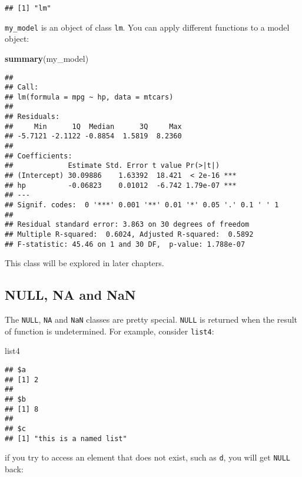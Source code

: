 \documentclass[
]{article}
\newenvironment{Shaded}{\begin{snugshade}}{\end{snugshade}}
\newcommand{\KeywordTok}[1]{\textcolor[rgb]{0.13,0.29,0.53}{\textbf{#1}}}
\newcommand{\NormalTok}[1]{#1}
\begin{document}
\begin{verbatim}
## [1] "lm"
\end{verbatim}

\texttt{my\_model} is an object of class \texttt{lm}. You can apply different functions to a model object:

\begin{Shaded}
\begin{Highlighting}[]
\KeywordTok{summary}\NormalTok{(my\_model)}
\end{Highlighting}
\end{Shaded}

\begin{verbatim}
## 
## Call:
## lm(formula = mpg ~ hp, data = mtcars)
## 
## Residuals:
##     Min      1Q  Median      3Q     Max 
## -5.7121 -2.1122 -0.8854  1.5819  8.2360 
## 
## Coefficients:
##             Estimate Std. Error t value Pr(>|t|)    
## (Intercept) 30.09886    1.63392  18.421  < 2e-16 ***
## hp          -0.06823    0.01012  -6.742 1.79e-07 ***
## ---
## Signif. codes:  0 '***' 0.001 '**' 0.01 '*' 0.05 '.' 0.1 ' ' 1
## 
## Residual standard error: 3.863 on 30 degrees of freedom
## Multiple R-squared:  0.6024, Adjusted R-squared:  0.5892 
## F-statistic: 45.46 on 1 and 30 DF,  p-value: 1.788e-07
\end{verbatim}

This class will be explored in later chapters.

\hypertarget{null-na-and-nan}{%
\subsection{NULL, NA and NaN}\label{null-na-and-nan}}

The \texttt{NULL}, \texttt{NA} and \texttt{NaN} classes are pretty special. \texttt{NULL} is returned when the result of function is undetermined.
For example, consider \texttt{list4}:

\begin{Shaded}
\begin{Highlighting}[]
\NormalTok{list4}
\end{Highlighting}
\end{Shaded}

\begin{verbatim}
## $a
## [1] 2
## 
## $b
## [1] 8
## 
## $c
## [1] "this is a named list"
\end{verbatim}

if you try to access an element that does not exist, such as \texttt{d}, you will get \texttt{NULL} back:
\end{document}
